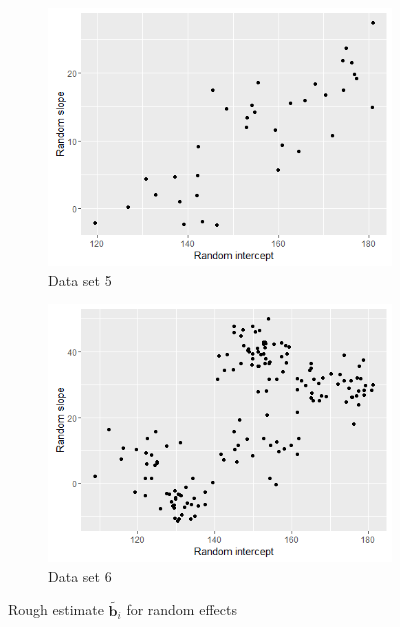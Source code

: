 \begin{figure}[!htb]
\centering
	\begin{subfigure}[b]{0.4\textwidth}
		\includegraphics[width=\textwidth]{mainmatter/chapter_5_simulation_study/ds_3fused3ppg_randplot.png}
       \caption{\label{fig : ds_3fused3ppg_randplot}Data set 5}
	\end{subfigure}    
    \begin{subfigure}[b]{0.4\textwidth}
		\includegraphics[width=\textwidth]{mainmatter/chapter_5_simulation_study/ds_5wellsep_randplot.png}
        \caption{\label{fig : ds_5wellsep_randplot}Data set 6}
	\end{subfigure}
\caption{\label{fig : ds_3fused3ppg_5wellsep}Rough estimate $\tilde{\boldsymbol{b}_i}$ for random effects}
\end{figure}

